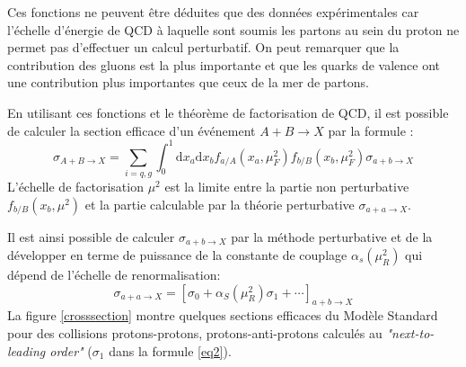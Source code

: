 Ces fonctions ne peuvent être déduites que des données expérimentales car l'échelle d'énergie de QCD à laquelle sont soumis les partons au sein du proton ne permet pas d'effectuer un calcul perturbatif. On peut remarquer que la contribution des gluons est la plus importante et que les quarks de valence ont une contribution plus importantes que ceux de la mer de partons.

En utilisant ces fonctions et le théorème de factorisation de QCD, il est possible de calculer la section efficace d'un événement $A+B\rightarrow X$ par la formule :
\begin{equation}
\sigma_{A+B\rightarrow X}=\sum_{i=q,g}\int_{0}^{1} \mathrm{d}x_{a}\mathrm{d}x_{b}f_{a/A}(x_{a},\mu_{F}^{2})f_{b/B}(x_{b},\mu_{F}^{2})\sigma{_{a+b\rightarrow X}}
\end{equation}
L'échelle de factorisation $\mu^{2}$ est la limite entre la partie non perturbative $f_{b/B}(x_{b},\mu^{2})$ et la partie calculable par la théorie perturbative $\sigma{_{a+a\rightarrow X}}$.

Il est ainsi possible de calculer $\sigma{_{a+b\rightarrow X}}$ par la méthode perturbative et de la développer en terme de puissance de la constante de couplage $\alpha_{s}\left(\mu_{R}^{2}\right)$ qui dépend de l'échelle de renormalisation:
\begin{equation}
\sigma_{a+a\rightarrow X}=\left[\sigma_{0}+\alpha_{S}\left(\mu_{R}^{2}\right)\sigma_{1}+\cdots\right]_{a+b\rightarrow X}
\label{eq2}
\end{equation}
La figure \ref{crosssection} montre quelques sections efficaces du Modèle Standard pour des collisions protons-protons, protons-anti-protons calculés au \textit{"next-to-leading order"} ($\sigma_{1}$ dans la formule \ref{eq2}).


